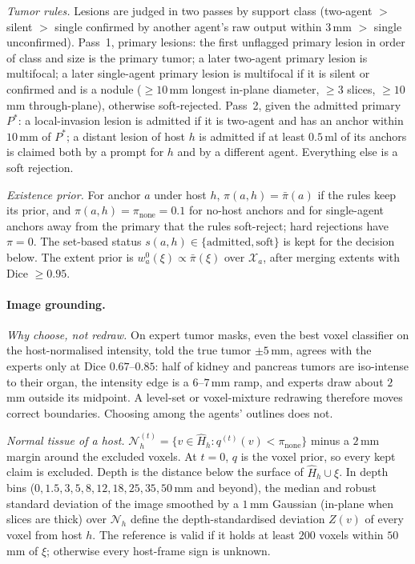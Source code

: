 \documentclass[fleqn,10pt]{olplainarticle}
\begin{document}
\emph{Tumor rules.} Lesions are judged in two passes by support class (two-agent $>$ silent $>$ single confirmed by another
agent's raw output within $3$\,mm $>$ single unconfirmed). Pass~1, primary lesions: the first unflagged primary lesion in
order of class and size is the primary tumor; a later two-agent primary lesion is multifocal; a later single-agent primary
lesion is multifocal if it is silent or confirmed and is a nodule ($\ge10$\,mm longest in-plane diameter, $\ge3$ slices,
$\ge10$\,mm through-plane), otherwise soft-rejected. Pass~2, given the admitted primary $P^{*}$: a local-invasion lesion is
admitted if it is two-agent and has an anchor within $10$\,mm of $P^{*}$; a distant lesion of host $h$ is admitted if at least
$0.5$\,ml of its anchors is claimed both by a prompt for $h$ and by a different agent. Everything else is a soft rejection.

\emph{Existence prior.} For anchor $a$ under host $h$, $\pi(a,h)=\bar\pi(a)$ if the rules keep its prior, and
$\pi(a,h)=\pi_{\mathrm{none}}=0.1$ for no-host anchors and for single-agent anchors away from the primary that the rules
soft-reject; hard rejections have $\pi=0$. The set-based status $s(a,h)\in\{\text{admitted},\text{soft}\}$ is kept for the
decision below. The extent prior is $w^{0}_a(\xi)\propto\bar\pi(\xi)$ over $\mathcal{X}_a$, after merging extents with Dice
$\ge0.95$.

\paragraph{Image grounding.}
\label{sec:grounding_details}
\emph{Why choose, not redraw.} On expert tumor masks, even the best voxel classifier on the host-normalised intensity, told
the true tumor $\pm5$\,mm, agrees with the experts only at Dice $0.67$--$0.85$: half of kidney and pancreas tumors are
iso-intense to their organ, the intensity edge is a $6$--$7$\,mm ramp, and experts draw about $2$\,mm outside its midpoint.
A level-set or voxel-mixture redrawing therefore moves correct boundaries. Choosing among the agents' outlines does not.

\emph{Normal tissue of a host.} $\mathcal{N}^{(t)}_h=\{v\in\hat H_h: q^{(t)}(v)<\pi_{\mathrm{none}}\}$ minus a $2$\,mm margin
around the excluded voxels. At $t=0$, $q$ is the voxel prior, so every kept claim is excluded. Depth is the distance below the
surface of $\hat H_h\cup\xi$. In depth bins ($0,1.5,3,5,8,12,18,25,35,50$\,mm and beyond), the median and robust standard
deviation of the image smoothed by a $1$\,mm Gaussian (in-plane when slices are thick) over $\mathcal{N}_h$ define the
depth-standardised deviation $Z(v)$ of every voxel from host $h$. The reference is valid if it holds at least $200$ voxels within
$50$\,mm of $\xi$; otherwise every host-frame sign is unknown.
\end{document}
